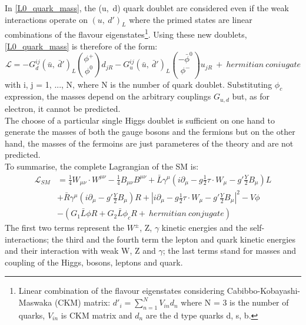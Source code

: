 In \ref{L0_quark_mass}, the (u,\ d) quark doublet are considered even if the weak interactions operate on $(u,\  d')_{L}$ where the primed states are  linear combinations of the flavour eigenstates\footnote{Linear combination of the flavour eigenstates considering Cabibbo-Kobayashi-Maswaka (CKM) matrix: $d'_i = \sum_{n=1}^NV_{in}d_n  $ where N = 3 is the number of quarks, $V_{in}$ is CKM matrix and $d_{n}$ are the d type quarks d, s, b.}. Using these new doublets, \ref{L0_quark_mass} is therefore of the form:
\begin{equation}
\mathcal{L}= -G_{d}^{ij}(\bar{u}, \ \bar{d}')_{L}{\phi^{+} \choose \phi^{0}}d_{jR}-G_{u}^{ij}(\bar{u}, \ \bar{d}')_{L}{-\bar{\phi}^{0} \choose \phi^{-}}u_{jR}\ +\ hermitian\  coniugate
\label{L0_quark_mass_2}
\end{equation}
with i, j = 1, ..., N,  where N is the number of quark doublet. Substituting $\phi_{c}$ expression, the masses depend on the arbitrary couplings $G_{u,d}$ but, as for electron, it cannot be predicted.\\
The choose of a particular single Higgs doublet is sufficient on one hand to generate the masses of both the gauge bosons and the fermions but on the other hand, the masses of the fermoins are just parameteres of the theory and are not predicted. 
\\ To summarise, the complete Lagrangian of the SM is:
\begin{equation}
\begin{split}
\mathcal{L}_{SM} &= \frac{1}{4}W_{\mu\nu}\cdot W^{\mu\nu} - \frac{1}{4}B_{\mu\nu}B^{\mu\nu} + \bar{L}\gamma^{\mu}(i\partial_{\mu}-g\frac{1}{2}\tau \cdot W_{\mu} -g'\frac{Y}{2}B_{\mu})L \\
&+\bar{R}\gamma^{\mu}(i\partial_{\mu}-g'\frac{Y}{2}B_{\mu})R+|i\partial_{\mu}-g\frac{1}{2}\tau \cdot W_{\mu} -g'\frac{Y}{2}B_{\mu}|^{2} -V{\phi} \\
&-(G_{1}\bar{L}\phi R+G_{2}\bar{L} \phi_{c}R +\ hermitian\ conjugate)
\label{L0_SM}
\end{split}
\end{equation}
The first two terms represent the $W^{\pm}$, Z, $\gamma$ kinetic energies and the self-interactions; the third and the fourth term the lepton and quark kinetic energies and their interaction with weak W, Z and $\gamma$; the last terms stand for masses and coupling of the Higgs, bosons, leptons and quark. \\
